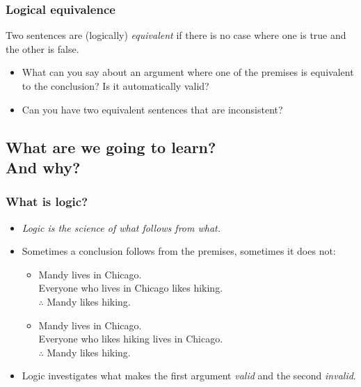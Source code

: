 \begin{frame}
  \frametitle{Logical equivalence}

  \begin{definition}
  Two sentences are (logically) \emph{equivalent} if there is no case where one is
  true and the other is false.
  \end{definition}

  \begin{itemize}[<+->]
    \item What can you say about an argument where one of the premises
    is equivalent to the conclusion? Is it automatically valid?
    \item Can you have two equivalent sentences that are inconsistent?
  \end{itemize}

\end{frame}


\subsection{What are we going to learn? \\ And why?}

\begin{frame}
  \frametitle{What is logic?}

  \begin{itemize}[<+->]
  \item \emph{Logic is the science of what follows from what.}
  \item Sometimes a conclusion follows from the premises, sometimes it
  does not:
  \begin{itemize}[<+->]
    \item Mandy lives in Chicago.\\ Everyone who lives in Chicago likes hiking.\\
    $\therefore$ Mandy likes hiking.
    \item Mandy lives in Chicago.\\ Everyone who likes hiking lives in Chicago.\\
    $\therefore$ Mandy likes hiking.
    \end{itemize}
  \item Logic investigates what makes the first argument \emph{valid}
    and the second \emph{invalid}.
  \end{itemize}
\end{frame}

